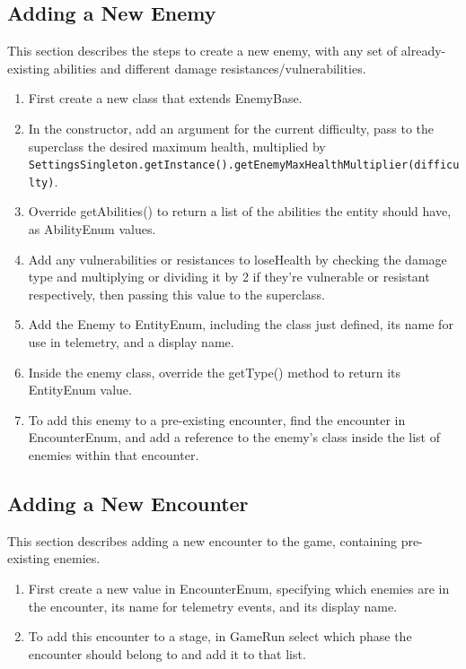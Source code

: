 \documentclass[11pt]{article}
\begin{document}
\subsection{Adding a New Enemy}
This section describes the steps to create a new enemy, with any set of already-existing abilities and different damage resistances/vulnerabilities. 

\begin{enumerate}
  \item First create a new class that extends EnemyBase.
  \item In the constructor, add an argument for the current difficulty, pass to the superclass the desired maximum health, multiplied by\\\verb|SettingsSingleton.getInstance().getEnemyMaxHealthMultiplier(difficulty)|. 
  \item Override getAbilities() to return a list of the abilities the entity should have, as AbilityEnum values.
  \item Add any vulnerabilities or resistances to loseHealth by checking the damage type and multiplying or dividing it by 2 if they're vulnerable or resistant respectively, then passing this value to the superclass.
  \item Add the Enemy to EntityEnum, including the class just defined, its name for use in telemetry, and a display name.
  \item Inside the enemy class, override the getType() method to return its EntityEnum value. 
  \item To add this enemy to a pre-existing encounter, find the encounter in EncounterEnum, and add a reference to the enemy's class inside the list of enemies within that encounter. 
\end{enumerate}

\subsection{Adding a New Encounter}
This section describes adding a new encounter to the game, containing pre-existing enemies.

\begin{enumerate}
  \item First create a new value in EncounterEnum, specifying which enemies are in the encounter, its name for telemetry events, and its display name.
  \item To add this encounter to a stage, in GameRun select which phase the encounter should belong to and add it to that list. 
\end{enumerate}
\end{document}
